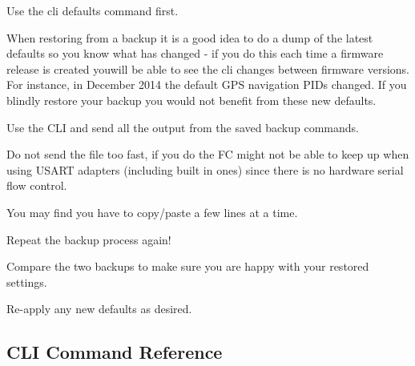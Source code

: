 Use the cli {\ttfamily defaults} command first.

When restoring from a backup it is a good idea to do a dump of the latest defaults so you know what has changed -\/ if you do this each time a firmware release is created youwill be able to see the cli changes between firmware versions. For instance, in December 2014 the default G\+P\+S navigation P\+I\+Ds changed. If you blindly restore your backup you would not benefit from these new defaults.

Use the C\+L\+I and send all the output from the saved backup commands.

Do not send the file too fast, if you do the F\+C might not be able to keep up when using U\+S\+A\+R\+T adapters (including built in ones) since there is no hardware serial flow control.

You may find you have to copy/paste a few lines at a time.

Repeat the backup process again!

Compare the two backups to make sure you are happy with your restored settings.

Re-\/apply any new defaults as desired.

\subsection*{C\+L\+I Command Reference}


